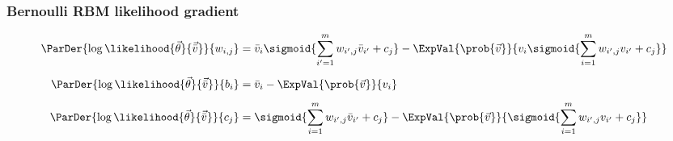 \begin{frame}
  \frametitle{Bernoulli RBM likelihood gradient}
  \begin{align*}
    \ParDer{\log\likelihood{\vec{\theta}}{\vec{\bar{v}}}}{w_{i,j}}
    &= \bar{v}_i \sigmoid{\sum_{i'=1}^m w_{i',j}\bar{v}_{i'}+c_j}
    -\ExpVal{\prob{\vec{v}}}{v_i \sigmoid{\sum_{i=1}^m w_{i',j}v_{i'}+c_j}} \\[5pt]
    \ParDer{\log\likelihood{\vec{\theta}}{\vec{\bar{v}}}}{b_i}
    &= \bar{v}_i -\ExpVal{\prob{\vec{v}}}{v_i} \\[5pt]
    \ParDer{\log\likelihood{\vec{\theta}}{\vec{\bar{v}}}}{c_j}
    &= \sigmoid{\sum_{i=1}^m w_{i',j}\bar{v}_{i'}+c_j}
    -\ExpVal{\prob{\vec{v}}}{\sigmoid{\sum_{i=1}^m w_{i',j}v_{i'}+c_j}}
  \end{align*}
\end{frame}



